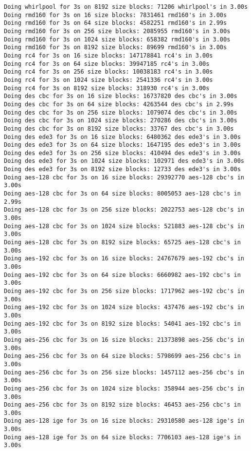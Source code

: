 \documentclass[%
 aip,
 jmp,%
 amsmath,amssymb,
 reprint,%
]{revtex4-1}
\begin{document}
\begin{verbatim}
Doing whirlpool for 3s on 8192 size blocks: 71206 whirlpool's in 3.00s
Doing rmd160 for 3s on 16 size blocks: 7831461 rmd160's in 3.00s
Doing rmd160 for 3s on 64 size blocks: 4582251 rmd160's in 2.99s
Doing rmd160 for 3s on 256 size blocks: 2085955 rmd160's in 3.00s
Doing rmd160 for 3s on 1024 size blocks: 658382 rmd160's in 3.00s
Doing rmd160 for 3s on 8192 size blocks: 89699 rmd160's in 3.00s
Doing rc4 for 3s on 16 size blocks: 147178841 rc4's in 3.00s
Doing rc4 for 3s on 64 size blocks: 39947185 rc4's in 3.00s
Doing rc4 for 3s on 256 size blocks: 10038183 rc4's in 3.00s
Doing rc4 for 3s on 1024 size blocks: 2541336 rc4's in 3.00s
Doing rc4 for 3s on 8192 size blocks: 318930 rc4's in 3.00s
Doing des cbc for 3s on 16 size blocks: 16737820 des cbc's in 3.00s
Doing des cbc for 3s on 64 size blocks: 4263544 des cbc's in 2.99s
Doing des cbc for 3s on 256 size blocks: 1079074 des cbc's in 3.00s
Doing des cbc for 3s on 1024 size blocks: 270286 des cbc's in 3.00s
Doing des cbc for 3s on 8192 size blocks: 33767 des cbc's in 3.00s
Doing des ede3 for 3s on 16 size blocks: 6480362 des ede3's in 3.00s
Doing des ede3 for 3s on 64 size blocks: 1647195 des ede3's in 3.00s
Doing des ede3 for 3s on 256 size blocks: 410494 des ede3's in 3.00s
Doing des ede3 for 3s on 1024 size blocks: 102971 des ede3's in 3.00s
Doing des ede3 for 3s on 8192 size blocks: 12733 des ede3's in 3.00s
Doing aes-128 cbc for 3s on 16 size blocks: 29392770 aes-128 cbc's in 3.00s
Doing aes-128 cbc for 3s on 64 size blocks: 8005053 aes-128 cbc's in 2.99s
Doing aes-128 cbc for 3s on 256 size blocks: 2022753 aes-128 cbc's in 3.00s
Doing aes-128 cbc for 3s on 1024 size blocks: 521883 aes-128 cbc's in 3.00s
Doing aes-128 cbc for 3s on 8192 size blocks: 65725 aes-128 cbc's in 3.00s
Doing aes-192 cbc for 3s on 16 size blocks: 24767679 aes-192 cbc's in 3.00s
Doing aes-192 cbc for 3s on 64 size blocks: 6660982 aes-192 cbc's in 3.00s
Doing aes-192 cbc for 3s on 256 size blocks: 1717962 aes-192 cbc's in 3.00s
Doing aes-192 cbc for 3s on 1024 size blocks: 437476 aes-192 cbc's in 3.00s
Doing aes-192 cbc for 3s on 8192 size blocks: 54041 aes-192 cbc's in 3.00s
Doing aes-256 cbc for 3s on 16 size blocks: 21373898 aes-256 cbc's in 3.00s
Doing aes-256 cbc for 3s on 64 size blocks: 5798699 aes-256 cbc's in 3.00s
Doing aes-256 cbc for 3s on 256 size blocks: 1457112 aes-256 cbc's in 3.00s
Doing aes-256 cbc for 3s on 1024 size blocks: 358944 aes-256 cbc's in 3.00s
Doing aes-256 cbc for 3s on 8192 size blocks: 46453 aes-256 cbc's in 3.00s
Doing aes-128 ige for 3s on 16 size blocks: 29310580 aes-128 ige's in 3.00s
Doing aes-128 ige for 3s on 64 size blocks: 7706103 aes-128 ige's in 3.00s

\end{verbatim}
\end{document}
